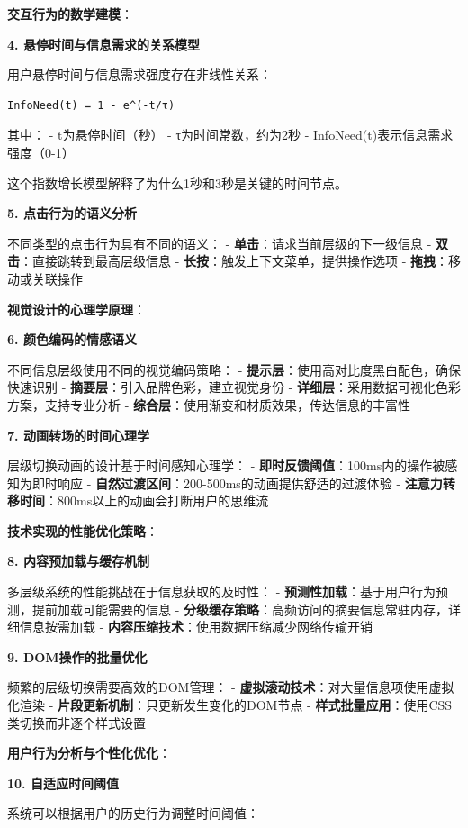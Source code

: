 \textbf{交互行为的数学建模}：

\textbf{4. 悬停时间与信息需求的关系模型}

用户悬停时间与信息需求强度存在非线性关系：

\begin{verbatim}
InfoNeed(t) = 1 - e^(-t/τ)
\end{verbatim}

其中： - t为悬停时间（秒） - τ为时间常数，约为2秒 - InfoNeed(t)表示信息需求强度（0-1）

这个指数增长模型解释了为什么1秒和3秒是关键的时间节点。

\textbf{5. 点击行为的语义分析}

不同类型的点击行为具有不同的语义： - \textbf{单击}：请求当前层级的下一级信息 - \textbf{双击}：直接跳转到最高层级信息 - \textbf{长按}：触发上下文菜单，提供操作选项 - \textbf{拖拽}：移动或关联操作

\textbf{视觉设计的心理学原理}：

\textbf{6. 颜色编码的情感语义}

不同信息层级使用不同的视觉编码策略： - \textbf{提示层}：使用高对比度黑白配色，确保快速识别 - \textbf{摘要层}：引入品牌色彩，建立视觉身份 - \textbf{详细层}：采用数据可视化色彩方案，支持专业分析 - \textbf{综合层}：使用渐变和材质效果，传达信息的丰富性

\textbf{7. 动画转场的时间心理学}

层级切换动画的设计基于时间感知心理学： - \textbf{即时反馈阈值}：100ms内的操作被感知为即时响应 - \textbf{自然过渡区间}：200-500ms的动画提供舒适的过渡体验 - \textbf{注意力转移时间}：800ms以上的动画会打断用户的思维流

\textbf{技术实现的性能优化策略}：

\textbf{8. 内容预加载与缓存机制}

多层级系统的性能挑战在于信息获取的及时性： - \textbf{预测性加载}：基于用户行为预测，提前加载可能需要的信息 - \textbf{分级缓存策略}：高频访问的摘要信息常驻内存，详细信息按需加载 - \textbf{内容压缩技术}：使用数据压缩减少网络传输开销

\textbf{9. DOM操作的批量优化}

频繁的层级切换需要高效的DOM管理： - \textbf{虚拟滚动技术}：对大量信息项使用虚拟化渲染 - \textbf{片段更新机制}：只更新发生变化的DOM节点 - \textbf{样式批量应用}：使用CSS类切换而非逐个样式设置

\textbf{用户行为分析与个性化优化}：

\textbf{10. 自适应时间阈值}

系统可以根据用户的历史行为调整时间阈值：

